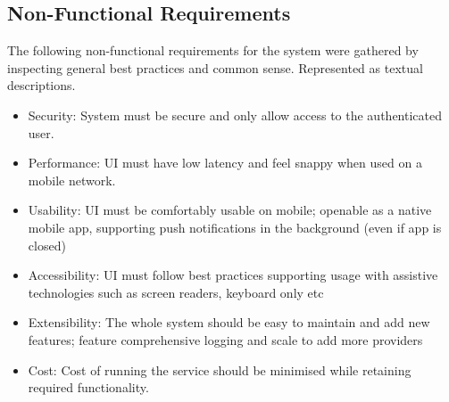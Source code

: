 \subsection{Non-Functional Requirements}
The following non-functional requirements for the system were gathered by inspecting general best practices and common sense. Represented as textual descriptions. 
\begin{itemize}
    \item Security: System must be secure and only allow access to the authenticated user. 
    \item Performance: UI must have low latency and feel snappy when used on a mobile network. 
    \item Usability: UI must be comfortably usable on mobile; openable as a native mobile app, supporting push notifications in the background (even if app is closed)
    \item Accessibility: UI must follow best practices supporting usage with assistive technologies such as screen readers, keyboard only etc
    \item Extensibility: The whole system should be easy to maintain and add new features; feature comprehensive logging and scale to add more providers
    \item Cost: Cost of running the service should be minimised while retaining required functionality.
\end{itemize}
